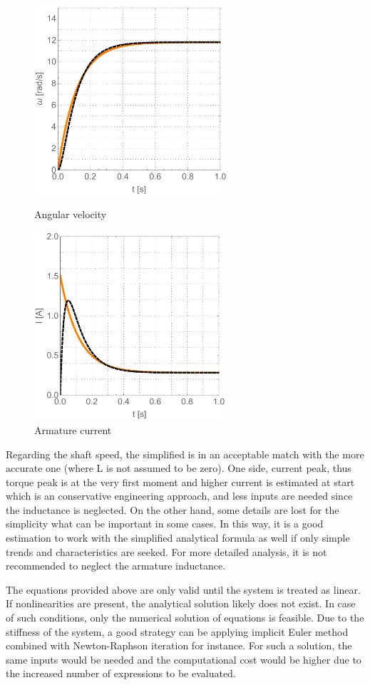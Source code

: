 \documentclass[12pt,english]{article}
\begin{document}
 \begin{figure}[htb!]
	\centering
	\includegraphics[height=7cm]{figures/mahemetica_comparision_1}
	\caption{Angular velocity}
	\label{mahemetica_comparision_1}
	\endminipage\hfill
	\centering
	\includegraphics[height=7cm]{figures/mahemetica_comparision_2}
	\caption{Armature current}
	\label{mahemetica_comparision_2}
	\endminipage\hfill
\end{figure}
Regarding the shaft speed, the simplified is in an acceptable match with the more accurate one (where L is not assumed to be zero). One side, current peak, thus torque peak is at the very first moment and higher current is  estimated at start which is an conservative engineering approach, and less inputs are needed since the inductance is neglected. On the other hand, some details are lost for the simplicity what can be important in some cases. In this way, it is a good estimation to work with the simplified analytical formula as well if only simple trends and characteristics are seeked. For more detailed analysis, it is not recommended to neglect the armature inductance. 


The equations provided above are only valid until the system is treated as linear. If nonlinearities are present, the analytical solution likely does not exist. In case of such conditions, only the numerical solution of equations is feasible. Due to the stiffness of the system, a good strategy can be applying implicit Euler method combined with Newton-Raphson iteration for instance. For such a solution, the same inputs would be needed and the computational cost would be higher due to the increased number of expressions to be evaluated.
\end{document}
